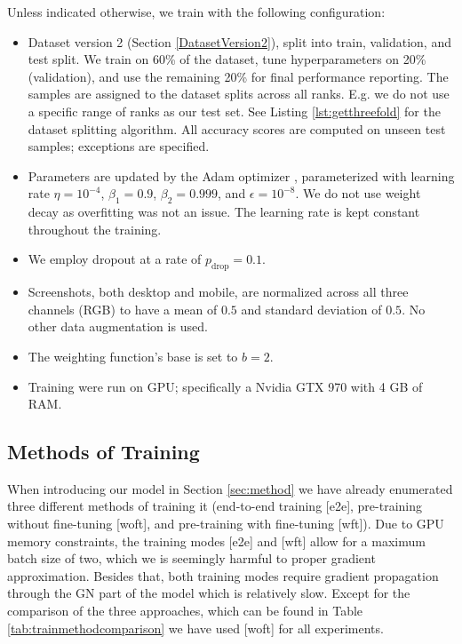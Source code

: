 Unless indicated otherwise, we train with the following configuration:
\begin{itemize}
    \item Dataset version 2 (Section \ref{DatasetVersion2}), split into train, validation, and test split. We train on 60\% of the dataset, tune hyperparameters on 20\% (validation), and use the remaining 20\% for final performance reporting. The samples are assigned to the dataset splits across all ranks. E.g. we do not use a specific range of ranks as our test set. See Listing \ref{lst:getthreefold} for the dataset splitting algorithm. All accuracy scores are computed on unseen test samples; exceptions are specified.
    \item Parameters are updated by the Adam optimizer \cite{kingma2014:adam}, parameterized with learning rate $\eta=10^{-4}$, $\beta_1=0.9$, $\beta_2=0.999$, and $\epsilon=10^{-8}$. We do not use weight decay as overfitting was not an issue. The learning rate is kept constant throughout the training.
    \item We employ dropout \cite{srivastava2014:dropout} at a rate of $p_\text{drop}=0.1$.
    \item Screenshots, both desktop and mobile, are normalized across all three channels (RGB) to have a mean of $0.5$ and standard deviation of $0.5$. No other data augmentation is used.
    \item The weighting function's base is set to $b=2$.
    \item Training were run on GPU; specifically a Nvidia GTX 970 with 4 GB of RAM.
\end{itemize}

\subsection{Methods of Training}

When introducing our model in Section \ref{sec:method} we have already enumerated three different methods of training it (end-to-end training [e2e], pre-training without fine-tuning [woft], and pre-training with fine-tuning [wft]). Due to GPU memory constraints, the training modes [e2e] and [wft] allow for a maximum batch size of two, which we is seemingly harmful to proper gradient approximation. Besides that, both training modes require gradient propagation through the GN part of the model which is relatively slow. Except for the comparison of the three approaches, which can be found in Table \ref{tab:trainmethodcomparison} we have used [woft] for all experiments.

